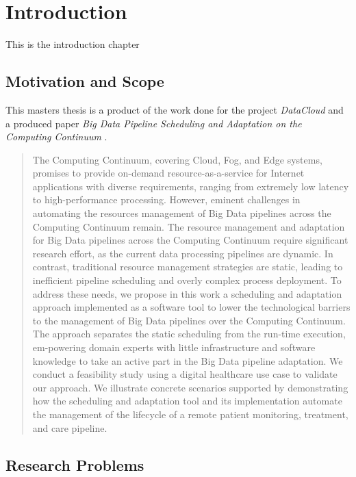 \chapter{Introduction}

    This is the introduction chapter

        \section{Motivation and Scope}
        \label{sec:motivation-and-scope-introduction}

            This masters thesis is a product of the work done for the project \emph{DataCloud} and a produced paper \emph{Big Data Pipeline Scheduling and Adaptation on the Computing Continuum} \cite{kimovskiBigDataPipeline2022}.

            \begin{quote}
                The Computing Continuum, covering Cloud, Fog, and Edge systems, promises to provide on-demand resource-as-a-service for Internet applications with diverse requirements, ranging from extremely low latency to high-performance processing. However, eminent challenges in automating the resources management of Big Data pipelines across the Computing Continuum remain. The resource management and adaptation for Big Data pipelines across the Computing Continuum require significant research effort, as the current data processing pipelines are dynamic. In contrast, traditional resource management strategies are static, leading to inefficient pipeline scheduling and overly complex process deployment. To address these needs, we propose in this work a scheduling and adaptation approach implemented as a software tool to lower the technological barriers to the management of Big Data pipelines over the Computing Continuum. The approach separates the static scheduling from the run-time execution, em-powering domain experts with little infrastructure and software knowledge to take an active part in the Big Data pipeline adaptation. We conduct a feasibility study using a digital healthcare use case to validate our approach. We illustrate concrete scenarios supported by demonstrating how the scheduling and adaptation tool and its implementation automate the management of the lifecycle of a remote patient monitoring, treatment, and care pipeline. \cite{kimovskiBigDataPipeline2022}
            \end{quote}

        \section{Research Problems}
        \label{sec:research-problems-introduction}

